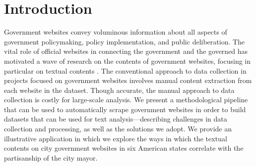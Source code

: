 \documentclass[11pt]{article}
\begin{document}
\section{Introduction}
Government websites convey voluminous information about all aspects of government policymaking, policy implementation, and public deliberation. The vital role of official websites in connecting the government and the governed has motivated a wave of research on the contents of government websites, focusing in particular on textual contents \citep[e.g.,][]{grimmelikhuijsen2010transparency,wang2005evaluating,osman2014cobra,Eschenfelder2002}. The conventional approach to data collection in projects focused on government websites involves manual content extraction from each website in the dataset. Though accurate, the manual approach to data collection is costly for large-scale analysis. We present a methodological pipeline that can be used to automatically scrape government websites in order to build datasets that can be used for text analysis---describing challenges in data collection and processing, as well as the solutions we adopt. We provide an illustrative application in which we explore the ways in which the textual contents on city government websites in six American states correlate with the partisanship of the city mayor.

\end{document}
